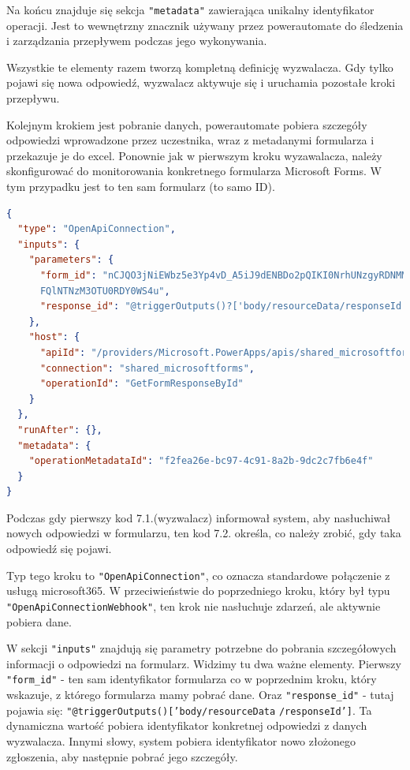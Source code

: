 Na końcu znajduje się sekcja \texttt{"metadata"} zawierająca unikalny identyfikator operacji. Jest to wewnętrzny znacznik używany przez \gls{powerautomate} do śledzenia i zarządzania przepływem podczas jego wykonywania.

Wszystkie te elementy razem tworzą kompletną definicję wyzwalacza. Gdy tylko pojawi się nowa odpowiedź, wyzwalacz aktywuje się i uruchamia pozostałe kroki przepływu.

Kolejnym krokiem jest pobranie danych, \gls{powerautomate} pobiera szczegóły odpowiedzi wprowadzone przez uczestnika, wraz z metadanymi formularza i przekazuje je do \gls{excel}. Ponownie jak w pierwszym kroku wyzawalacza, należy skonfigurować do monitorowania konkretnego formularza Microsoft Forms. W tym przypadku jest to ten sam formularz (to samo ID). 

\begin{lstlisting}[language=JSON, caption=Konfiguracja pobrania szczegółów odpowiedzi z formularza w Power Automate w języku JSON źródło: kod wygenerowany na podstwie konfiguracji poprzez narzędzie Power Automate]
{
  "type": "OpenApiConnection",
  "inputs": {
    "parameters": {
      "form_id": "nCJQO3jNiEWbz5e3Yp4vD_A5iJ9dENBDo2pQIKI0NrhUNzgyRDNMM1JWRTR
      FQlNTNzM3OTU0RDY0WS4u",
      "response_id": "@triggerOutputs()?['body/resourceData/responseId']"
    },
    "host": {
      "apiId": "/providers/Microsoft.PowerApps/apis/shared_microsoftforms",
      "connection": "shared_microsoftforms",
      "operationId": "GetFormResponseById"
    }
  },
  "runAfter": {},
  "metadata": {
    "operationMetadataId": "f2fea26e-bc97-4c91-8a2b-9dc2c7fb6e4f"
  }
}
\end{lstlisting}

Podczas gdy pierwszy kod 7.1.(wyzwalacz) informował system, aby nasłuchiwał nowych odpowiedzi w formularzu, ten kod 7.2. określa, co należy zrobić, gdy taka odpowiedź się pojawi.

Typ tego kroku to \texttt{"OpenApiConnection"}, co oznacza standardowe połączenie z usługą \gls{microsoft365}. W przeciwieństwie do poprzedniego kroku, który był typu \texttt{"OpenApiConnectionWebhook"}, ten krok nie nasłuchuje zdarzeń, ale aktywnie pobiera dane.

W sekcji \texttt{"inputs"} znajdują się parametry potrzebne do pobrania szczegółowych informacji o odpowiedzi na formularz. Widzimy tu dwa ważne elementy. Pierwszy \texttt{"form\_id"} - ten sam identyfikator formularza co w poprzednim kroku, który wskazuje, z którego formularza mamy pobrać dane. Oraz \texttt{"response\_id"} - tutaj pojawia się: \texttt{"@triggerOutputs()}\texttt{['body/resourceData} \texttt{/responseId']}. Ta dynamiczna wartość pobiera identyfikator konkretnej odpowiedzi z danych wyzwalacza. Innymi słowy, system pobiera identyfikator nowo złożonego zgłoszenia, aby następnie pobrać jego szczegóły.

